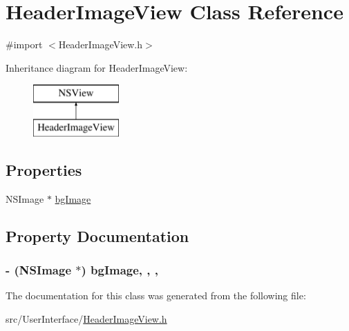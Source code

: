 \hypertarget{interface_header_image_view}{\section{Header\-Image\-View Class Reference}
\label{interface_header_image_view}
}


{\ttfamily \#import $<$Header\-Image\-View.\-h$>$}

Inheritance diagram for Header\-Image\-View\-:\begin{figure}[H]
\begin{center}
\leavevmode
\includegraphics[height=2.000000cm]{interface_header_image_view}
\end{center}
\end{figure}
\subsection*{Properties}
\begin{DoxyCompactItemize}
\item 
N\-S\-Image $\ast$ \hyperlink{interface_header_image_view_a3e7c34f89ce1e643154582b06fd6043e}{bg\-Image}
\end{DoxyCompactItemize}


\subsection{Property Documentation}
\hypertarget{interface_header_image_view_a3e7c34f89ce1e643154582b06fd6043e}{
\subsubsection[{bg\-Image}]{\setlength{\rightskip}{0pt plus 5cm}-\/ (N\-S\-Image $\ast$) bg\-Image\hspace{0.3cm}{\ttfamily [read]}, {\ttfamily [write]}, {\ttfamily [atomic]}, {\ttfamily [retain]}}}\label{interface_header_image_view_a3e7c34f89ce1e643154582b06fd6043e}


The documentation for this class was generated from the following file\-:\begin{DoxyCompactItemize}
\item 
src/\-User\-Interface/\hyperlink{_header_image_view_8h}{Header\-Image\-View.\-h}\end{DoxyCompactItemize}
